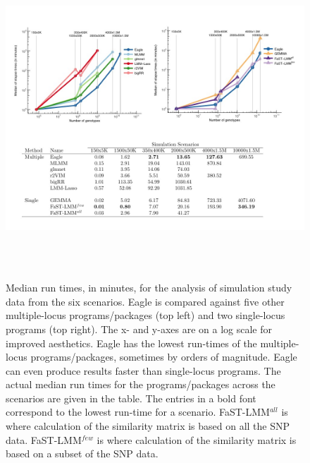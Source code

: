 \documentclass{article}
\begin{document}
  

 
\begin{figure}
\caption{Median run times, in minutes, for the analysis of simulation study data from the six scenarios. 
Eagle is compared against five other multiple-locus programs/packages (top left) and two single-locus programs (top right). 
The x- and y-axes are on a log scale for improved aesthetics. Eagle has the lowest run-times of the multiple-locus 
programs/packages, sometimes by orders of magnitude. Eagle can even produce results faster than single-locus programs. 
The actual median run times for the programs/packages across the scenarios are given in the table. The entries in a bold font 
correspond to the lowest run-time for a scenario. 
 FaST-LMM$^{all}$ is where calculation of the similarity matrix is based on all the SNP data.  
 FaST-LMM$^{few}$ is where calculation  of the similarity matrix is based on a subset of the SNP data. }

\label{fig_time}
\begin{center}
\includegraphics[width=14cm, height=12cm]{Figure2_time.jpg}
\end{center}

\end{figure}
\end{document}
